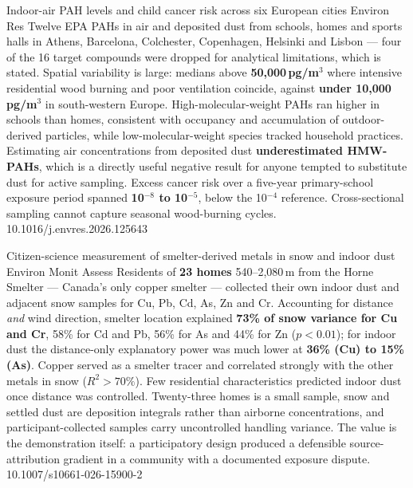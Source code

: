 \documentclass[10pt]{article}
\begin{document}
{Indoor-air PAH levels and child cancer risk across six European cities}
{Environ Res}
{Twelve EPA PAHs in air and deposited dust from schools, homes and sports halls in Athens,
Barcelona, Colchester, Copenhagen, Helsinki and Lisbon --- four of the 16 target compounds
were dropped for analytical limitations, which is stated. Spatial variability is large:
medians above \textbf{50{,}000\,pg/m$^3$} where intensive residential wood burning and poor
ventilation coincide, against \textbf{under 10{,}000\,pg/m$^3$} in south-western Europe.
High-molecular-weight PAHs ran higher in schools than homes, consistent with occupancy and
accumulation of outdoor-derived particles, while low-molecular-weight species tracked
household practices. Estimating air concentrations from deposited dust \textbf{underestimated
HMW-PAHs}, which is a directly useful negative result for anyone tempted to substitute dust
for active sampling. Excess cancer risk over a five-year primary-school exposure period
spanned \textbf{10$^{-8}$ to 10$^{-5}$}, below the 10$^{-4}$ reference. Cross-sectional
sampling cannot capture seasonal wood-burning cycles.}
{10.1016/j.envres.2026.125643}

{Citizen-science measurement of smelter-derived metals in snow and indoor dust}
{Environ Monit Assess}
{Residents of \textbf{23 homes} 540--2{,}080\,m from the Horne Smelter --- Canada's only copper
smelter --- collected their own indoor dust and adjacent snow samples for Cu, Pb, Cd, As, Zn
and Cr. Accounting for distance \emph{and} wind direction, smelter location explained
\textbf{73\% of snow variance for Cu and Cr}, 58\% for Cd and Pb, 56\% for As and 44\% for Zn
($p<0.01$); for indoor dust the distance-only explanatory power was much lower at
\textbf{36\% (Cu) to 15\% (As)}. Copper served as a smelter tracer and correlated strongly
with the other metals in snow ($R^2>70\%$). Few residential characteristics predicted indoor
dust once distance was controlled. Twenty-three homes is a small sample, snow and settled
dust are deposition integrals rather than airborne concentrations, and participant-collected
samples carry uncontrolled handling variance. The value is the demonstration itself: a
participatory design produced a defensible source-attribution gradient in a community with a
documented exposure dispute.}
{10.1007/s10661-026-15900-2}
\end{document}

